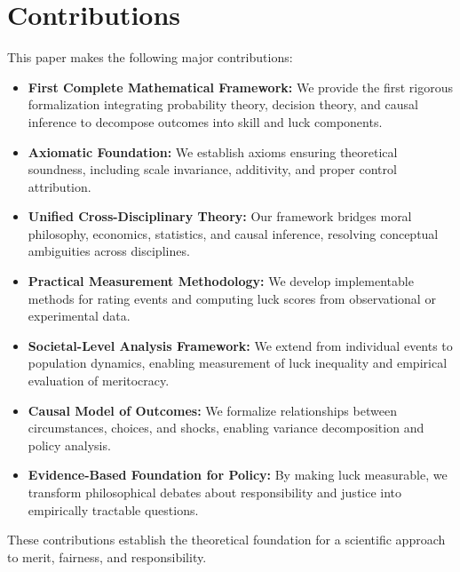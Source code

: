 \section{Contributions}
\label{sec:contributions}

This paper makes the following major contributions:

\begin{itemize}
  \item \textbf{First Complete Mathematical Framework:} We provide the
    first rigorous formalization integrating probability theory, decision
    theory, and causal inference to decompose outcomes into skill and
    luck components.

  \item \textbf{Axiomatic Foundation:} We establish axioms ensuring
    theoretical soundness, including scale invariance, additivity, and proper
    control attribution.

  \item \textbf{Unified Cross-Disciplinary Theory:} Our framework
    bridges moral philosophy, economics, statistics, and causal inference,
    resolving conceptual ambiguities across disciplines.

  \item \textbf{Practical Measurement Methodology:} We develop
    implementable methods for rating events and computing luck scores
    from observational or experimental data.

  \item \textbf{Societal-Level Analysis Framework:} We extend from
    individual events to population dynamics, enabling measurement of luck
    inequality and empirical evaluation of meritocracy.

  \item \textbf{Causal Model of Outcomes:} We formalize relationships
    between circumstances, choices, and shocks, enabling variance decomposition
    and policy analysis.

  \item \textbf{Evidence-Based Foundation for Policy:} By making luck
    measurable, we transform philosophical debates about responsibility and
    justice into empirically tractable questions.
\end{itemize}

These contributions establish the theoretical foundation for a scientific
approach to merit, fairness, and responsibility.

